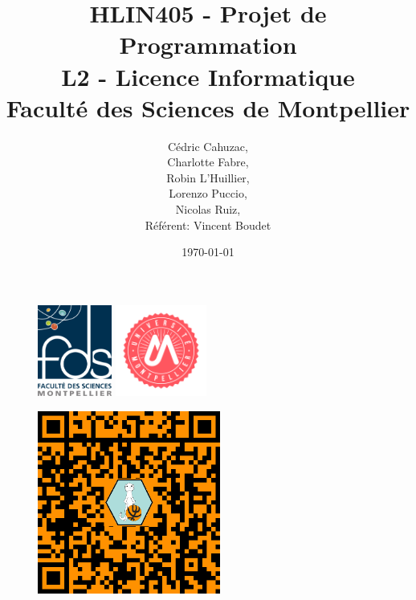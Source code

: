 \documentclass[12pt]{report}
\begin{document}
    \begin{figure}
		\centering
			\includegraphics[height=3cm]{figures/LogoFDS.png}
		    \includegraphics[height=3cm]{figures/LogoUM.png}
	\end{figure}
	\bigskip
	\begin{figure}
		\centering
    \includegraphics[height=6cm]{figures/qr.png}
	\end{figure}
	\bigskip			
	
	
	\title{HLIN405 - Projet de Programmation \\
	L2 - Licence Informatique \\
	Faculté des Sciences de Montpellier \\}
	\author{Cédric Cahuzac,\\ Charlotte Fabre,\\ Robin L'Huillier,\\ Lorenzo Puccio,\\ Nicolas Ruiz,\\ \bigskip Référent: Vincent Boudet}
	\date{\today}

		\begin{titlingpage}
			\begin{center}
				\vspace{5cm}
				\begin{LARGE}\thetitle\end{LARGE}
			    \vspace{2cm}
				\begin{large}\theauthor\end{large} \\
				\vspace{2cm} 
				\thedate
			\end{center}
		\end{titlingpage}
		\tableofcontents
		\listoffigures
\end{document}
